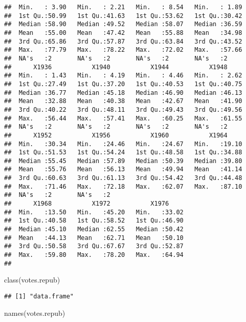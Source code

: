 \documentclass[
]{article}
\newenvironment{Shaded}{\begin{snugshade}}{\end{snugshade}}
\newcommand{\FunctionTok}[1]{\textcolor[rgb]{0.00,0.00,0.00}{#1}}
\newcommand{\NormalTok}[1]{#1}
\begin{document}
\begin{verbatim}
##  Min.   : 3.90   Min.   : 2.21   Min.   : 8.54   Min.   : 1.89  
##  1st Qu.:50.99   1st Qu.:41.63   1st Qu.:53.62   1st Qu.:30.42  
##  Median :58.90   Median :49.52   Median :58.07   Median :36.59  
##  Mean   :55.00   Mean   :47.42   Mean   :55.88   Mean   :34.98  
##  3rd Qu.:65.86   3rd Qu.:57.87   3rd Qu.:63.84   3rd Qu.:43.52  
##  Max.   :77.79   Max.   :78.22   Max.   :72.02   Max.   :57.66  
##  NA's   :2       NA's   :2       NA's   :2       NA's   :2      
##      X1936           X1940           X1944           X1948      
##  Min.   : 1.43   Min.   : 4.19   Min.   : 4.46   Min.   : 2.62  
##  1st Qu.:27.49   1st Qu.:37.20   1st Qu.:40.53   1st Qu.:40.75  
##  Median :36.77   Median :45.18   Median :46.90   Median :46.13  
##  Mean   :32.88   Mean   :40.38   Mean   :42.67   Mean   :41.90  
##  3rd Qu.:40.22   3rd Qu.:48.11   3rd Qu.:49.43   3rd Qu.:49.56  
##  Max.   :56.44   Max.   :57.41   Max.   :60.25   Max.   :61.55  
##  NA's   :2       NA's   :2       NA's   :2       NA's   :2      
##      X1952           X1956           X1960           X1964      
##  Min.   :30.34   Min.   :24.46   Min.   :24.67   Min.   :19.10  
##  1st Qu.:51.53   1st Qu.:54.24   1st Qu.:48.58   1st Qu.:34.88  
##  Median :55.45   Median :57.89   Median :50.39   Median :39.80  
##  Mean   :55.76   Mean   :56.13   Mean   :49.94   Mean   :41.14  
##  3rd Qu.:60.63   3rd Qu.:61.13   3rd Qu.:54.42   3rd Qu.:44.48  
##  Max.   :71.46   Max.   :72.18   Max.   :62.07   Max.   :87.10  
##  NA's   :2       NA's   :2                                      
##      X1968           X1972           X1976      
##  Min.   :13.50   Min.   :45.20   Min.   :33.02  
##  1st Qu.:40.58   1st Qu.:58.52   1st Qu.:46.90  
##  Median :45.10   Median :62.55   Median :50.42  
##  Mean   :44.13   Mean   :62.71   Mean   :50.10  
##  3rd Qu.:50.58   3rd Qu.:67.67   3rd Qu.:52.87  
##  Max.   :59.80   Max.   :78.20   Max.   :64.94  
## 
\end{verbatim}

\begin{Shaded}
\begin{Highlighting}[]
\FunctionTok{class}\NormalTok{(votes.repub)}
\end{Highlighting}
\end{Shaded}

\begin{verbatim}
## [1] "data.frame"
\end{verbatim}

\begin{Shaded}
\begin{Highlighting}[]
\FunctionTok{names}\NormalTok{(votes.repub)}
\end{Highlighting}
\end{Shaded}
\end{document}
